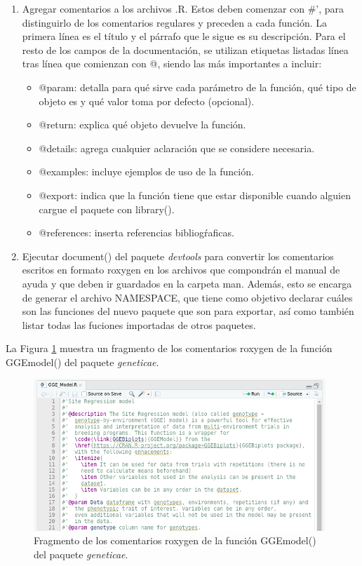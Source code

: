\begin{enumerate}

\item Agregar comentarios a los archivos .R. Estos deben comenzar con \#', para distinguirlo de los comentarios regulares y preceden a cada función. La primera línea es el título y el párrafo que le sigue es su descripción. Para el resto de los campos de la documentación, se utilizan etiquetas listadas línea tras línea que comienzan con @, siendo las más importantes a incluir:

\begin{itemize}
\item @param: detalla para qué sirve cada parámetro de la función, qué tipo de objeto es y qué valor toma por defecto (opcional).
\item @return: explica qué objeto devuelve la función.
\item @details: agrega cualquier aclaración que se considere necesaria.
\item @examples: incluye ejemplos de uso de la función.
\item @export: indica que la función tiene que estar disponible cuando alguien cargue el paquete con \textcolor{fandango}{library()}.
\item @references: inserta referencias bibliogŕaficas.
\end{itemize}

\item Ejecutar \textcolor{fandango}{document()} del paquete \emph{devtools} para convertir los comentarios escritos en formato roxygen en los archivos que compondrán el manual de ayuda y que deben ir guardados en la carpeta man. Además, esto se encarga de generar el archivo NAMESPACE, que tiene como objetivo declarar cuáles son las funciones del nuevo paquete que son para exportar, así como también listar todas las fuciones importadas de otros paquetes.

\end{enumerate}

La Figura \ref{fig:fig35} muestra un fragmento de los comentarios roxygen de la función \textcolor{fandango}{GGEmodel()} del paquete \emph{geneticae}.

\begin{figure}[h]
	\begin{center}
		\includegraphics[width=11cm]{./Graficos/COMENTARIOSROXYGEN.png}	
	\end{center}
	\caption{Fragmento de los comentarios roxygen de la función \textcolor{fandango}{GGEmodel()} del paquete \emph{geneticae}.}
	\label{fig:fig35}
\end{figure}


